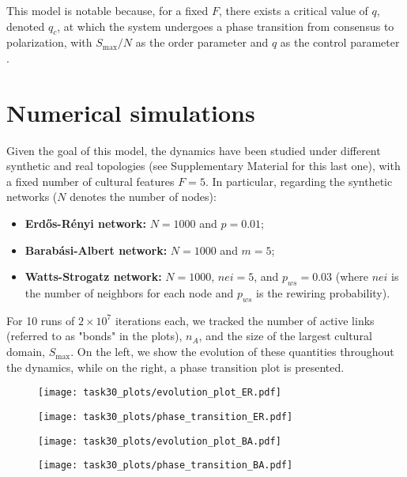 This model is notable because, for a fixed $F$, there exists a critical value of $q$, denoted $q_c$, at which the system undergoes a phase transition from consensus to polarization, with $S_{\max}/N$ as the order parameter and $q$ as the control parameter \cite{axelrod_phase_transition}.

\section{Numerical simulations}
Given the goal of this model, the dynamics have been studied under different synthetic and real topologies (see Supplementary Material for this last one), with a fixed number of cultural features $F = 5$. In particular, regarding the synthetic networks ($N$ denotes the number of nodes):
\begin{itemize}
    \item \textbf{Erd\H{o}s-Rényi network:} $N = 1000$ and $p = 0.01$;
    \item \textbf{Barab\'asi-Albert network:} $N = 1000$ and $m = 5$;
    \item \textbf{Watts-Strogatz network:} $N = 1000$, $nei = 5$, and $p_{ws} = 0.03$ (where $nei$ is the number of neighbors for each node and $p_{ws}$ is the rewiring probability).
\end{itemize}
For 10 runs of $2 \times 10^7$ iterations each, we tracked the number of active links (referred to as "bonds" in the plots), $n_A$, and the size of the largest cultural domain, $S_{\max}$. On the left, we show the evolution of these quantities throughout the dynamics, while on the right, a phase transition plot is presented.

\begin{figure}[htbp]
    \centering
    \begin{minipage}{0.58\textwidth}
        \centering
        \texttt{[image: task30\_plots/evolution\_plot\_ER.pdf]}
    \end{minipage}
    \hfill
    \begin{minipage}{0.4\textwidth}
        \centering
        \texttt{[image: task30\_plots/phase\_transition\_ER.pdf]}
    \end{minipage}
\end{figure}

\begin{figure}[htbp]
    \centering
    \begin{minipage}{0.58\textwidth}
        \centering
        \texttt{[image: task30\_plots/evolution\_plot\_BA.pdf]}
        \end{minipage}
    \hfill
    \begin{minipage}{0.4\textwidth}
        \centering
        \texttt{[image: task30\_plots/phase\_transition\_BA.pdf]}
    \end{minipage}
\end{figure}

